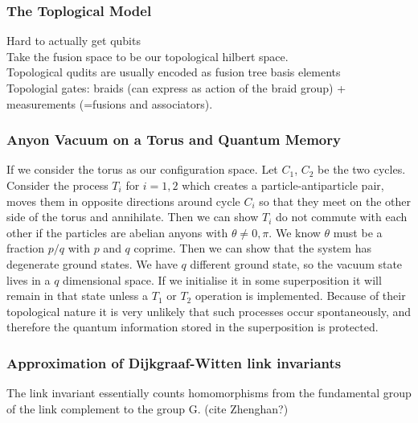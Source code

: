 \documentclass{article}
\begin{document}
\subsubsection{The Toplogical Model}
Hard to actually get qubits\\
Take the fusion space to be our topological hilbert space.\\
Topological qudits are usually encoded as fusion tree basis elements\\
Topologial gates: braids (can express as action of the braid group) + measurements (=fusions and associators).


\subsubsection{Anyon Vacuum on a Torus and Quantum Memory}
If we consider the torus as our configuration space. Let $C_1$, $C_2$ be the two cycles. Consider the process $T_i$ for $i=1,2$ which creates a particle-antiparticle pair, moves them in opposite directions around cycle $C_i$ so that they meet on the other side of the torus and annihilate. Then we can show $T_i$ do not commute with each other if the particles are abelian anyons with $\theta \neq 0, \pi$. We know $\theta$ must be a fraction $p/q$ with $p$ and $q$ coprime. Then we can show that the system has degenerate ground states. We have $q$ different ground state, so the vacuum state lives in a $q$ dimensional space. If we initialise it in some superposition it will remain in that state unless a $T_1$ or $T_2$ operation is implemented. Because of their topological nature it is very unlikely that such processes occur spontaneously, and therefore the quantum information stored in the superposition is protected.

\subsubsection{Approximation of Dijkgraaf-Witten link invariants}
The link invariant essentially counts homomorphisms from the fundamental group
of the link complement to the group G. (cite Zhenghan?)

\end{document}
